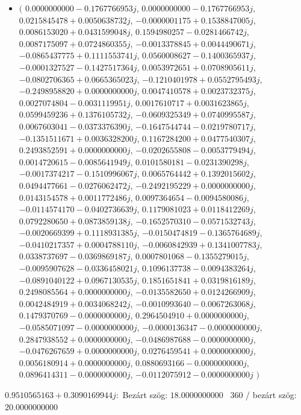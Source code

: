 \documentclass[14pt,a4paper]{article}
\begin{document}
\begin{itemize}
\item
$\big($
$0.0000000000-0.1767766953j$, $0.0000000000-0.1767766953j$, $0.0215845478+0.0050638732j$, $-0.0000001175+0.1538847005j$, $0.0086153020+0.0431599048j$, $0.1594980257-0.0281466742j$, $0.0087175097+0.0724860355j$, $-0.0013378845+0.0044490671j$, $-0.0865437775+0.1111553741j$, $0.0560008627-0.1400365937j$, $-0.0001327527-0.1427517364j$, $0.0053972651+0.0708905611j$, $-0.0802706365+0.0665365023j$, $-0.1210401978+0.0552795493j$, $-0.2498958820+0.0000000000j$, $0.0047410578+0.0023732375j$, $0.0027074804-0.0031119951j$, $0.0017610717+0.0031623865j$, $0.0599459236+0.1376105732j$, $-0.0609325349+0.0740995587j$, $0.0067603041-0.0373376390j$, $-0.1647544744-0.0219780717j$, $-0.1351511671+0.0036328200j$, $0.1167284200+0.0477540307j$, $0.2493852591+0.0000000000j$, $-0.0202655808-0.0053779494j$, $0.0014720615-0.0085641949j$, $0.0101580181-0.0231390298j$, $-0.0017374217-0.1510996067j$, $0.0065764442+0.1392015602j$, $0.0494477661-0.0276062472j$, $-0.2492195229+0.0000000000j$, $0.0143154578+0.0011772486j$, $0.0097364654-0.0094580086j$, $-0.0114574170-0.0402736639j$, $0.1179081023+0.0118412269j$, $0.0792280650+0.0873859138j$, $-0.1652570310-0.0571532743j$, $-0.0020669399+0.1118931385j$, $-0.0150474819-0.1365764689j$, $-0.0410217357+0.0004788110j$, $-0.0060842939+0.1341007783j$, $0.0338737697-0.0369869187j$, $0.0007801068-0.1355279015j$, $-0.0095907628-0.0336458021j$, $0.1096137738-0.0094383264j$, $-0.0891040122+0.0967130535j$, $0.1851651841+0.0319816189j$, $0.2498085564+0.0000000000j$, $-0.0135582650+0.0124266909j$, $0.0042484919+0.0034068242j$, $-0.0010993640-0.0067263068j$, $0.1479370769-0.0000000000j$, $0.2964504910+0.0000000000j$, $-0.0585071097-0.0000000000j$, $-0.0000136347-0.0000000000j$, $0.2847938552+0.0000000000j$, $-0.0486987688-0.0000000000j$, $-0.0476267659+0.0000000000j$, $0.0276459541+0.0000000000j$, $0.0056180914+0.0000000000j$, $0.0880693166-0.0000000000j$, $0.0896414311-0.0000000000j$, $-0.0112075912-0.0000000000j$
$\big)$
\end{itemize}
$0.9510565163+0.3090169944j$:\
Bezárt szög: $18.0000000000$ \
360 / bezárt szög: $20.0000000000$\
\end{document}
